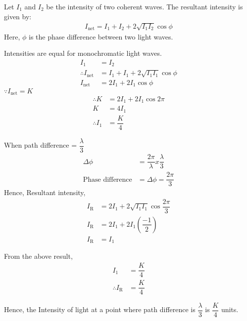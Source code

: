 \documentclass[journal,12pt,twocolumn]{IEEEtran}
\theoremstyle{remark}
\begin{document}
Let $I_1$ and $I_2$ be the intensity of two coherent waves. The resultant intensity is given by:
\begin{align}
    I_{\text{net}} = I_1 + I_2 + 2\sqrt{I_1I_2}\cos{\phi}
\end{align}
Here, $\phi$ is the phase difference between two light waves.

Intensities are equal for monochromatic light waves.
\begin{align}
   I_1 &= I_2 \\
\therefore I_{\text{net}} &= I_1 + I_1 + 2\sqrt{I_1I_1}\cos{\phi} \nonumber \\ 
        I_{\text{net}} &= 2I_1 + 2I_1\cos{\phi}
\end{align}
$\because I_{\text{net}} = K$
\begin{align}
   \therefore K &= 2I_1 +2I_1\cos{2\pi} \nonumber \\
    K &= 4I_1 \nonumber \\
 \therefore    I_1&=\dfrac{K}{4} 
\end{align}

When path difference = $\dfrac{\lambda}{3}$ \\
\begin{align}
\Delta \phi &= \dfrac{2\pi}{\lambda}  x  \dfrac{\lambda}{3} \nonumber \\
\text{Phase difference} &=  \Delta \phi = \dfrac{2\pi}{3}
\end{align}
Hence,
\hspace*{0.5cm}Resultant intensity,
\begin{align}
I_{\text{R}} &= 2I_1 + 2\sqrt{I_1I_1}\cos{\dfrac{2\pi}{3}} \nonumber  \\
I_{\text{R}} &= 2I_1 + 2I_1\left(\dfrac{-1}{2}\right)\nonumber \\
I_{\text{R}} &= I_1
\end{align}

From the above result,
\hspace*{0.5cm}
\begin{align}
I_1 &= \dfrac{K}{4} \nonumber \\
\therefore I_{\text{R}} &= \dfrac{K}{4} 
\end{align}

Hence, the Intensity of light at a point where path difference is $\dfrac{\lambda}{3}$ is $\dfrac{K}{4}$ units.


\end{document}
